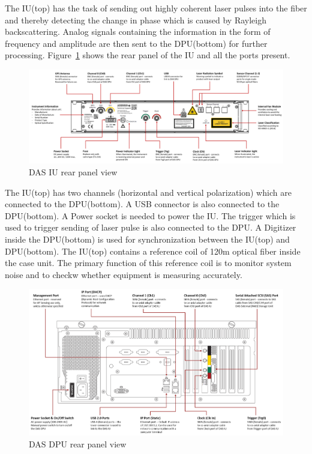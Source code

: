 The IU(top) has the task of sending out highly coherent laser pulses into the fiber and thereby detecting the change in phase which is caused by Rayleigh backscattering. Analog signals containing the information in the form of frequency and amplitude are then sent to the DPU(bottom) for further processing. Figure~\ref{IU} shows the rear panel of the IU and all the ports present.

\begin{figure}[h]
    \centering
    \includegraphics[width=\linewidth]{Bilder/jpg/DAS IU Technical Description.png}
    \caption{DAS IU rear panel view~\cite{DAS_Manual}}
    \label{IU}
\end{figure}

The IU(top) has two channels (horizontal and vertical polarization) which are connected to the DPU(bottom). A USB connector is also connected to the DPU(bottom). A Power socket is needed to power the IU. The trigger which is used to trigger sending of laser pulse is also connected to the DPU. A Digitizer inside the DPU(bottom) is used for synchronization between the IU(top) and DPU(bottom). The IU(top) contains a reference coil of 120m optical fiber inside the case unit. The primary function of this reference coil is to monitor system noise and to checkw whether equipment is measuring accurately. 

\begin{figure}[h]
    \centering
    \includegraphics[width=\linewidth]{Bilder/jpg/DAS DPU Rear.png}
    \caption{DAS DPU rear panel view~\cite{DAS_Manual}}
    \label{DPU}
\end{figure}

